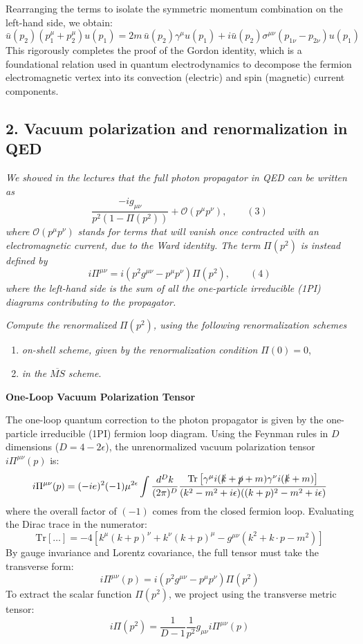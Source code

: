 Rearranging the terms to isolate the symmetric momentum combination on the left-hand side, we obtain:
\[
    \bar{u}(p_2) (p_1^\mu + p_2^\mu) u(p_1) = 2m \, \bar{u}(p_2) \gamma^\mu u(p_1) + i \bar{u}(p_2) \sigma^{\mu\nu} (p_{1\nu} - p_{2\nu}) u(p_1)
\]
This rigorously completes the proof of the Gordon identity, which is a foundational relation used in quantum electrodynamics to decompose the fermion electromagnetic vertex into its convection (electric) and spin (magnetic) current components.


\subsection*{2. Vacuum polarization and renormalization in QED}

\begin{center}
    \textit{We showed in the lectures that the full photon propagator in QED can be written as}
    \[
        \frac{-i g_{\mu\nu}}{p^2 (1 - \Pi(p^2))} + \mathcal{O}(p^\mu p^\nu), \qquad (3)
    \]
    \textit{where} $\mathcal{O}(p^\mu p^\nu)$ \textit{stands for terms that will vanish once contracted with an electromagnetic current, due to the Ward identity. The term} $\Pi(p^2)$ \textit{is instead defined by}
    \[
        i \Pi^{\mu\nu} = i (p^2 g^{\mu\nu} - p^\mu p^\nu) \Pi(p^2), \qquad (4)
    \]
    \textit{where the left-hand side is the sum of all the one-particle irreducible (1PI) diagrams contributing to the propagator.}

    \textit{Compute the renormalized } $\Pi(p^2)$\textit{, using the following renormalization schemes}
    \begin{enumerate}
        \item \textit{on-shell scheme, given by the renormalization condition} $\Pi(0) = 0$,
        \item \textit{in the} $\overline{MS}$ \textit{scheme}.
    \end{enumerate}
\end{center}

\textbf{One-Loop Vacuum Polarization Tensor}

The one-loop quantum correction to the photon propagator is given by the one-particle irreducible (1PI) fermion loop diagram. Using the Feynman rules in $D$ dimensions ($D = 4 - 2\epsilon$), the unrenormalized vacuum polarization tensor $i\Pi^{\mu\nu}(p)$ is:
\[
    i\Pi^{\mu\nu}(p) = (-ie)^2 (-1) \mu^{2\epsilon} \int \frac{d^D k}{(2\pi)^D} \frac{\text{Tr}\left[ \gamma^\mu i(\slashed{k} + \slashed{p} + m) \gamma^\nu i(\slashed{k} + m) \right]}{(k^2 - m^2 + i\epsilon)((k+p)^2 - m^2 + i\epsilon)}
\]
where the overall factor of $(-1)$ comes from the closed fermion loop. Evaluating the Dirac trace in the numerator:
\[
    \text{Tr}[\dots] = -4 \left[ k^\mu(k+p)^\nu + k^\nu(k+p)^\mu - g^{\mu\nu}(k^2 + k \cdot p - m^2) \right]
\]
By gauge invariance and Lorentz covariance, the full tensor must take the transverse form:
\[
    i\Pi^{\mu\nu}(p) = i(p^2 g^{\mu\nu} - p^\mu p^\nu) \Pi(p^2)
\]
To extract the scalar function $\Pi(p^2)$, we project using the transverse metric tensor:
\[
    i\Pi(p^2) = \frac{1}{D-1} \frac{1}{p^2} g_{\mu\nu} i\Pi^{\mu\nu}(p)
\]

